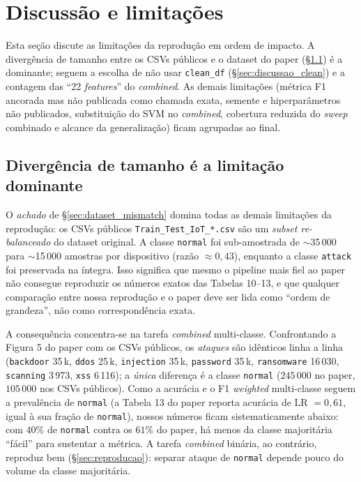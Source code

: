 \section{Discussão e limitações}
\label{sec:discussao}

Esta seção discute as limitações da reprodução em ordem de impacto. A
divergência de tamanho entre os CSVs públicos e o dataset do paper
(\S{}\ref{sec:discussao_dataset}) é a dominante; seguem a escolha de
não usar \texttt{clean\_df} (\S{}\ref{sec:discussao_clean}) e a
contagem das ``22 \emph{features}'' do \emph{combined}. As demais
limitações (métrica F1 ancorada mas não publicada como chamada exata,
semente e hiperparâmetros não publicados, substituição do SVM no
\emph{combined}, cobertura reduzida do \emph{sweep} combinado e alcance
da generalização) ficam agrupadas ao final.

\subsection{Divergência de tamanho é a limitação dominante}
\label{sec:discussao_dataset}

O \emph{achado} de \S{}\ref{sec:dataset_mismatch} domina todas as
demais limitações da reprodução: os CSVs públicos
\texttt{Train\_Test\_IoT\_*.csv} são um \emph{subset re-balanceado}
do dataset original. A classe \texttt{normal} foi sub-amostrada de
$\sim$35\,000 para $\sim$15\,000 amostras por dispositivo
(razão $\approx 0{,}43$), enquanto a classe \texttt{attack} foi
preservada na íntegra. Isso significa que mesmo o pipeline mais
fiel ao paper não consegue reproduzir os números exatos das
Tabelas 10--13, e que qualquer comparação entre nossa reprodução e o
paper deve ser lida como ``ordem de grandeza'', não como correspondência
exata.

A consequência concentra-se na tarefa \emph{combined} multi-classe.
Confrontando a Figura 5 do paper com os CSVs públicos, os \emph{ataques}
são idênticos linha a linha (\texttt{backdoor} 35\,k, \texttt{ddos}
25\,k, \texttt{injection} 35\,k, \texttt{password} 35\,k,
\texttt{ransomware} 16\,030, \texttt{scanning} 3\,973, \texttt{xss}
6\,116); a \emph{única} diferença é a classe \texttt{normal}
($245\,000$ no paper, $105\,000$ nos CSVs públicos). Como a acurácia e o
F1 \emph{weighted} multi-classe seguem a prevalência de \texttt{normal}
(a Tabela 13 do paper reporta acurácia de LR $=0{,}61$, igual à sua
fração de \texttt{normal}), nossos números ficam sistematicamente
abaixo: com $40\%$ de \texttt{normal} contra os $61\%$ do paper, há menos
da classe majoritária ``fácil'' para sustentar a métrica. A tarefa
\emph{combined} binária, ao contrário, reproduz bem
(\S{}\ref{sec:reproducao}): separar ataque de \texttt{normal} depende
pouco do volume da classe majoritária.


